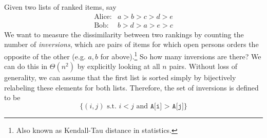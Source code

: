   \begin{definition}[Inversions]
    \label{def:inversions}
    Given two lists of ranked items, say 
    \begin{align}
      \text{Alice}: & a > b > c > d > e \\
      \text{Bob}: & b > d > a > e > c
    \end{align}
    We want to measure the dissimilarity between two rankings by counting the number of \textit{inversions}, which are pairs of items for which open persons orders the opposite of the other (e.g. $a, b$ for above).\footnote{Also known as Kendall-Tau distance in statistics.} So how many inversions are there? We can do this in $\Theta(n^2)$ by explicitly looking at all $n$ pairs. Without loss of generality, we can assume that the first list is sorted simply by bijectively relabeling these elements for both lists. Therefore, the set of inversions is defined to be 
    \begin{equation}
      \{(i, j) \text{ s.t. } i < j \text{ and } \texttt{A[i] > A[j]}\}
    \end{equation}
  \end{definition}


